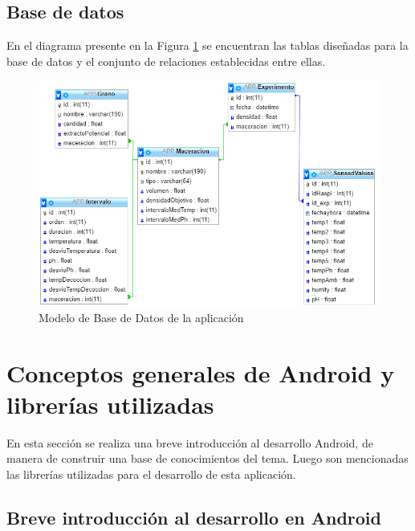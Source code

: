     \subsection{Base de datos}
        \par En el diagrama presente en la Figura \ref{fig:DiagramaBdApp} se encuentran las tablas diseñadas para la base de datos y el conjunto de relaciones establecidas entre ellas.
        
        \begin{figure}[h]
            \centering
            \includegraphics[scale=0.8]{DiagramaBaseDeDatosAPP.jpg}
            \caption{Modelo de Base de Datos de la aplicación}
            \label{fig:DiagramaBdApp}
        \end{figure}

\section{Conceptos generales de Android y librerías utilizadas}
    \par En esta sección se realiza una breve introducción al desarrollo Android, de manera de construir una base de conocimientos del tema. Luego son mencionadas las librerías utilizadas para el desarrollo de esta aplicación.
    
    \subsection{Breve introducción al desarrollo en Android}
    
